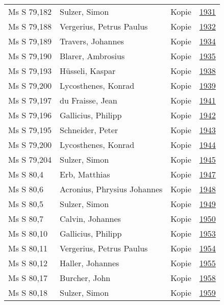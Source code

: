 \documentclass[10pt,a4paper,landscape]{report}
\begin{document}
\begin{longtable}{p{16cm}p{4cm}lr}
Ms S 79,182	&	Sulzer, Simon	&	Kopie	&	\href{http://130.60.24.72/assignment/1931}{1931}\\
Ms S 79,188	&	Vergerius, Petrus Paulus	&	Kopie	&	\href{http://130.60.24.72/assignment/1932}{1932}\\
Ms S 79,189	&	Travers, Johannes	&	Kopie	&	\href{http://130.60.24.72/assignment/1934}{1934}\\
Ms S 79,190	&	Blarer, Ambrosius	&	Kopie	&	\href{http://130.60.24.72/assignment/1935}{1935}\\
Ms S 79,193	&	Hüsseli, Kaspar	&	Kopie	&	\href{http://130.60.24.72/assignment/1938}{1938}\\
Ms S 79,200	&	Lycosthenes, Konrad	&	Kopie	&	\href{http://130.60.24.72/assignment/1939}{1939}\\
Ms S 79,197	&	du Fraisse, Jean	&	Kopie	&	\href{http://130.60.24.72/assignment/1941}{1941}\\
Ms S 79,196	&	Gallicius, Philipp	&	Kopie	&	\href{http://130.60.24.72/assignment/1942}{1942}\\
Ms S 79,195	&	Schneider, Peter	&	Kopie	&	\href{http://130.60.24.72/assignment/1943}{1943}\\
Ms S 79,200	&	Lycosthenes, Konrad	&	Kopie	&	\href{http://130.60.24.72/assignment/1944}{1944}\\
Ms S 79,204	&	Sulzer, Simon	&	Kopie	&	\href{http://130.60.24.72/assignment/1945}{1945}\\
Ms S 80,4	&	Erb, Matthias	&	Kopie	&	\href{http://130.60.24.72/assignment/1947}{1947}\\
Ms S 80,6	&	Acronius, Phrysius Johannes	&	Kopie	&	\href{http://130.60.24.72/assignment/1948}{1948}\\
Ms S 80,5	&	Sulzer, Simon	&	Kopie	&	\href{http://130.60.24.72/assignment/1949}{1949}\\
Ms S 80,7	&	Calvin, Johannes	&	Kopie	&	\href{http://130.60.24.72/assignment/1950}{1950}\\
Ms S 80,10	&	Gallicius, Philipp	&	Kopie	&	\href{http://130.60.24.72/assignment/1953}{1953}\\
Ms S 80,11	&	Vergerius, Petrus Paulus	&	Kopie	&	\href{http://130.60.24.72/assignment/1954}{1954}\\
Ms S 80,12	&	Haller, Johannes	&	Kopie	&	\href{http://130.60.24.72/assignment/1955}{1955}\\
Ms S 80,17	&	Burcher, John	&	Kopie	&	\href{http://130.60.24.72/assignment/1958}{1958}\\
Ms S 80,18	&	Sulzer, Simon	&	Kopie	&	\href{http://130.60.24.72/assignment/1959}{1959}\\

\end{longtable}
\end{document}
